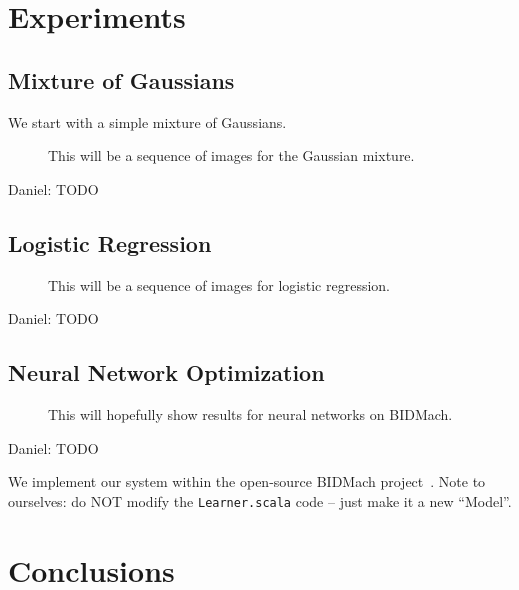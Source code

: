\documentclass{article}
\begin{document}
\section{Experiments}\label{sec:experiments}

\subsection{Mixture of Gaussians}\label{ssec:gaussians}

We start with a simple mixture of Gaussians.

\begin{figure}[ht]
  \centering
  \fbox{\rule[-.5cm]{0cm}{4cm} \rule[-.5cm]{4cm}{0cm}}
  \caption{This will be a sequence of images for the Gaussian mixture.}
\end{figure}

{\color{blue}
Daniel: TODO
}

\subsection{Logistic Regression}\label{ssec:logistic}

\begin{figure}[ht]
  \centering
  \fbox{\rule[-.5cm]{0cm}{4cm} \rule[-.5cm]{4cm}{0cm}}
  \caption{This will be a sequence of images for logistic regression.}
\end{figure}

{\color{blue}
Daniel: TODO
}

\subsection{Neural Network Optimization}\label{ssec:nets}

\begin{figure}[ht]
  \centering
  \fbox{\rule[-.5cm]{0cm}{4cm} \rule[-.5cm]{4cm}{0cm}}
  \caption{This will hopefully show results for neural networks on BIDMach.}
\end{figure}

{\color{blue}
Daniel: TODO
}

We implement our system within the open-source BIDMach project~\cite{canny2013bidmach}. Note to
ourselves: do NOT modify the \texttt{Learner.scala} code -- just make it a new ``Model''.




\section{Conclusions}\label{sec:conclusion}
\end{document}
